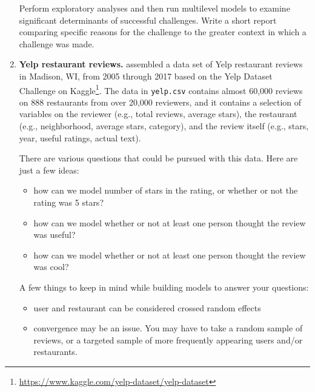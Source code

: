 \documentclass[
]{krantz}
\providecommand{\tightlist}{%
  \setlength{\itemsep}{0pt}\setlength{\parskip}{0pt}}
\renewcommand{\href}[2]{#2\footnote{\url{#1}}}
\begin{document}
\begin{enumerate}
  Perform exploratory analyses and then run multilevel models to examine significant determinants of successful challenges. Write a short report comparing specific reasons for the challenge to the greater context in which a challenge was made.
\item
  \textbf{Yelp restaurant reviews.} \citet{Mohr2018} assembled a data set of Yelp restaurant reviews in Madison, WI, from 2005 through 2017 based on the Yelp Dataset Challenge on \href{https://www.kaggle.com/yelp-dataset/yelp-dataset}{Kaggle}. The data in \texttt{yelp.csv} contains almost 60,000 reviews on 888 restaurants from over 20,000 reviewers, and it contains a selection of variables on the reviewer (e.g., total reviews, average stars), the restaurant (e.g., neighborhood, average stars, category), and the review itself (e.g., stars, year, useful ratings, actual text).

  There are various questions that could be pursued with this data. Here are just a few ideas:

  \begin{itemize}
  \tightlist
  \item
    how can we model number of stars in the rating, or whether or not the rating was 5 stars?
  \item
    how can we model whether or not at least one person thought the review was useful?
  \item
    how can we model whether or not at least one person thought the review was cool?
  \end{itemize}

  A few things to keep in mind while building models to answer your questions:

  \begin{itemize}
  \tightlist
  \item
    user and restaurant can be considered crossed random effects
  \item
    convergence may be an issue. You may have to take a random sample of reviews, or a targeted sample of more frequently appearing users and/or restaurants.
  \end{itemize}
\end{enumerate}

  

\backmatter
\printindex
\end{document}
